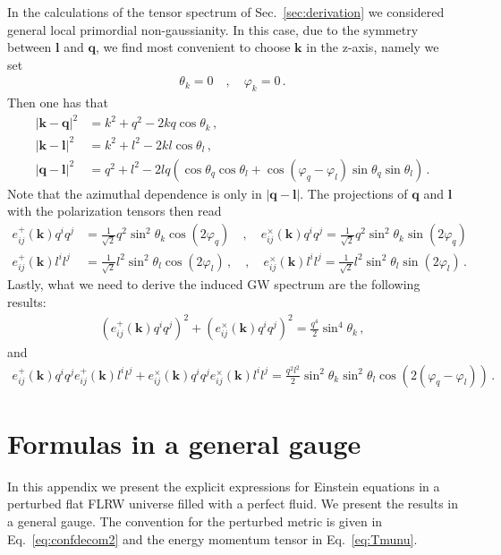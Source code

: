\documentclass[a4paper,11pt]{article}
\numberwithin{equation}{section}
\begin{document}
In the calculations of the tensor spectrum of Sec.~\ref{sec:derivation} we considered general local primordial non-gaussianity. In this case, due to the symmetry between $\mathbf{l}$ and $\mathbf{q}$, we find most convenient to choose $\mathbf{k}$ in the z-axis, namely we set
\begin{align}
\theta_k=0\quad,\quad \varphi_k=0\,.
\end{align}
Then one has that
\begin{align}
|\mathbf{k}-\mathbf{q}|^2&=k^2+q^2-2kq\cos\theta_k\,,\\
|\mathbf{k}-\mathbf{l}|^2&=k^2+l^2-2kl\cos\theta_l\,,\\
|\mathbf{q}-\mathbf{l}|^2&=q^2+l^2-2lq\left(\cos\theta_{q}\cos\theta_{l}+\cos(\varphi_q-\varphi_l)\sin\theta_{q}\sin\theta_{l}\right)\,.
\end{align}
Note that the azimuthal dependence is only in $|\mathbf{q}-\mathbf{l}|$. The projections of $\mathbf{q}$ and $\mathbf{l}$ with the polarization tensors then read
\begin{align}
e^{+}_{ij}(\mathbf{k})q^iq^j&=\frac{1}{\sqrt{2}}q^2\sin^2\theta_{k}\cos(2\varphi_q)\quad,\quad
e^{\times}_{ij}(\mathbf{k})q^iq^j=\frac{1}{\sqrt{2}}q^2\sin^2\theta_{k}\sin(2\varphi_q)\\
e^{+}_{ij}(\mathbf{k})l^il^j&=\frac{1}{\sqrt{2}}l^2\sin^2\theta_{l}\cos(2\varphi_l)\,,\quad,\quad
e^{\times}_{ij}(\mathbf{k})l^il^j=\frac{1}{\sqrt{2}}l^2\sin^2\theta_{l}\sin(2\varphi_l)\,.
\end{align}
Lastly, what we need to derive the induced GW spectrum are the following results:
\begin{align}
\left(e^{+}_{ij}(\mathbf{k})q^iq^j\right)^2+\left(e^{\times}_{ij}(\mathbf{k})q^iq^j\right)^2=\frac{q^4}{2}\sin^4\theta_{k}\,,
\end{align}
and
\begin{align}
e^{+}_{ij}(\mathbf{k})q^iq^je^{+}_{ij}(\mathbf{k})l^il^j+e^{\times}_{ij}(\mathbf{k})q^iq^je^{\times}_{ij}(\mathbf{k})l^il^j=\frac{q^2l^2}{2}\sin^2\theta_{k}\sin^2\theta_{l}\cos(2(\varphi_q-\varphi_l))\,.
\end{align}


\section{Formulas in a general gauge \label{app:generalgauge}}

In this appendix we present the explicit expressions for Einstein equations in a perturbed flat FLRW universe filled with a perfect fluid. We present the results in a general gauge. The convention for the perturbed metric is given in Eq.~\eqref{eq:confdecom2} and the energy momentum tensor in Eq.~\eqref{eq:Tmunu}.
\end{document}
